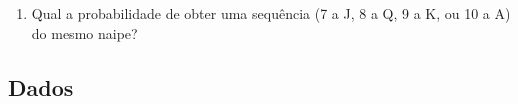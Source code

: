 \documentclass[
  11pt]{report}
\begin{document}
\begin{itemize}
\begin{enumerate}

  \item
    Qual a probabilidade de obter uma sequência (7 a J, 8 a Q, 9 a K, ou 10 a A) do mesmo naipe?

  \end{enumerate}
\end{itemize}

\hypertarget{dados}{%
\subsection{Dados}\label{dados}}
\end{document}
